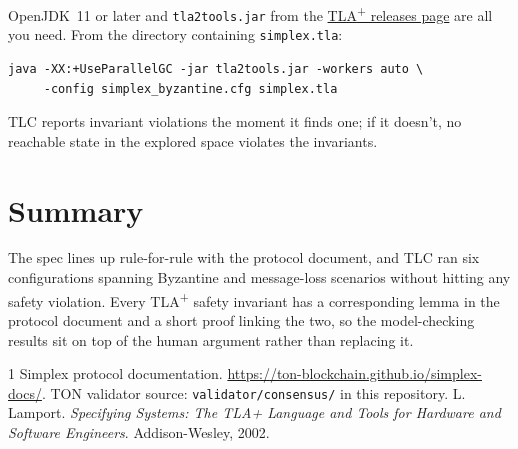\documentclass[11pt,a4paper]{article}
\begin{document}
OpenJDK~11 or later and \verb|tla2tools.jar| from the
\href{https://github.com/tlaplus/tlaplus/releases}{TLA\textsuperscript{+}
releases page} are all you need. From the directory containing
\verb|simplex.tla|:

\begin{verbatim}
java -XX:+UseParallelGC -jar tla2tools.jar -workers auto \
     -config simplex_byzantine.cfg simplex.tla
\end{verbatim}

TLC reports invariant violations the moment it finds one; if it doesn't,
no reachable state in the explored space violates the invariants.

\section{Summary}

The spec lines up rule-for-rule with the protocol document, and TLC
ran six configurations spanning Byzantine and message-loss scenarios
without hitting any safety violation. Every TLA\textsuperscript{+}
safety invariant has a corresponding lemma in the protocol document
and a short proof linking the two, so the model-checking results sit
on top of the human argument rather than replacing it.

\begin{thebibliography}{1}
Simplex protocol documentation.
\url{https://ton-blockchain.github.io/simplex-docs/}.
TON validator source: \texttt{validator/consensus/} in this
repository.
L. Lamport.
\emph{Specifying Systems: The TLA+ Language and Tools for Hardware
and Software Engineers}. Addison-Wesley, 2002.
\end{thebibliography}
\end{document}
